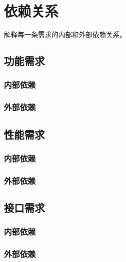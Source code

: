 \chapter{依赖关系}

解释每一条需求的内部和外部依赖关系。
\section{功能需求}
\subsection{内部依赖}
\subsection{外部依赖}

\section{性能需求}
\subsection{内部依赖}
\subsection{外部依赖}

\section{接口需求}
\subsection{内部依赖}
\subsection{外部依赖}